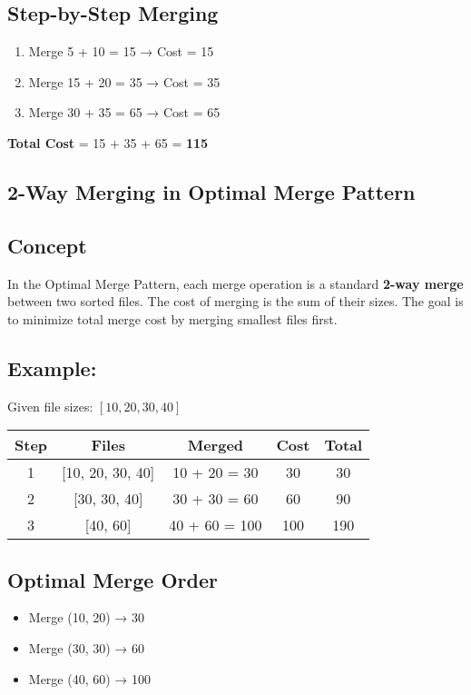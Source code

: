 \documentclass[14pt]{extarticle}
\begin{document}
\subsection*{Step-by-Step Merging}
\begin{enumerate}
    \item Merge 5 + 10 = 15 → Cost = 15
    \item Merge 15 + 20 = 35 → Cost = 35
    \item Merge 30 + 35 = 65 → Cost = 65
\end{enumerate}

\textbf{Total Cost} = 15 + 35 + 65 = \textbf{115}

\subsection{2-Way Merging in Optimal Merge Pattern}

\subsection*{Concept}
In the Optimal Merge Pattern, each merge operation is a standard \textbf{2-way merge} between two sorted files. The cost of merging is the sum of their sizes. The goal is to minimize total merge cost by merging smallest files first.

\subsection*{Example:}
Given file sizes: $[10, 20, 30, 40]$

\begin{tabular}{|c|c|c|c|c|}
\hline
\textbf{Step} & \textbf{Files} & \textbf{Merged} & \textbf{Cost} & \textbf{Total} \\
\hline
1 & [10, 20, 30, 40] & 10 + 20 = 30 & 30 & 30 \\
2 & [30, 30, 40] & 30 + 30 = 60 & 60 & 90 \\
3 & [40, 60] & 40 + 60 = 100 & 100 & 190 \\
\hline
\end{tabular}

\subsection*{Optimal Merge Order}
\begin{itemize}
    \item Merge (10, 20) → 30
    \item Merge (30, 30) → 60
    \item Merge (40, 60) → 100
\end{itemize}
\end{document}
